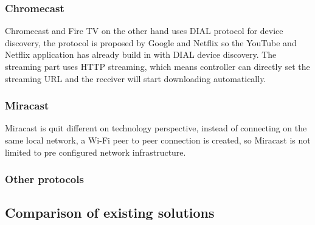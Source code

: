 \subsubsection{Chromecast}
Chromecast and Fire TV on the other hand uses DIAL protocol for device discovery, the protocol is 
proposed by Google and Netflix so the YouTube and Netflix application has already build in with DIAL 
device discovery. The streaming part uses HTTP streaming, which means controller can directly set the 
streaming URL and the receiver will start downloading automatically.
\subsubsection{Miracast}

Miracast is quit different on technology perspective, instead of connecting on the same local network, 
a Wi-Fi peer to peer connection is created, so Miracast is not limited to pre configured network 
infrastructure.
\subsubsection{Other protocols}


\subsection{Comparison of existing solutions}
